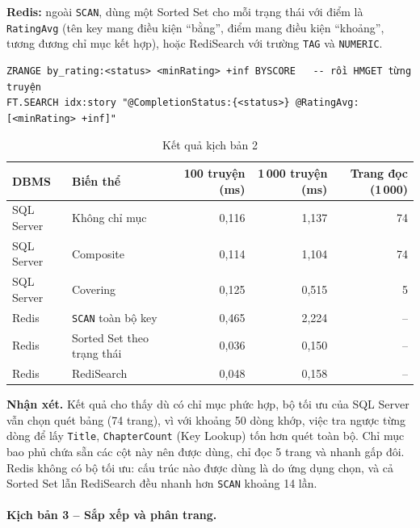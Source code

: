 \textbf{Redis:} ngoài \texttt{SCAN}, dùng một Sorted Set cho mỗi trạng thái với điểm là \texttt{RatingAvg} (tên key mang điều kiện ``bằng'', điểm mang điều kiện ``khoảng'', tương đương chỉ mục kết hợp), hoặc RediSearch với trường \texttt{TAG} và \texttt{NUMERIC}.

\begin{verbatim}
ZRANGE by_rating:<status> <minRating> +inf BYSCORE   -- rồi HMGET từng truyện
FT.SEARCH idx:story "@CompletionStatus:{<status>} @RatingAvg:[<minRating> +inf]"
\end{verbatim}

\begin{table}[H]
\centering\small
\begin{tabular}{|l|l|r|r|r|}
\hline
\textbf{DBMS} & \textbf{Biến thể} & \textbf{100 truyện (ms)} & \textbf{1\,000 truyện (ms)} & \textbf{Trang đọc (1\,000)} \\ \hline
SQL Server & Không chỉ mục & 0,116 & 1,137 & 74 \\ \hline
SQL Server & Composite & 0,114 & 1,104 & 74 \\ \hline
SQL Server & Covering & 0,125 & 0,515 & 5 \\ \hline
Redis & \texttt{SCAN} toàn bộ key & 0,465 & 2,224 & -- \\ \hline
Redis & Sorted Set theo trạng thái & 0,036 & 0,150 & -- \\ \hline
Redis & RediSearch & 0,048 & 0,158 & -- \\ \hline
\end{tabular}
\caption{Kết quả kịch bản 2}
\label{tab:idx-i2}
\end{table}

\textbf{Nhận xét.} Kết quả cho thấy dù có chỉ mục phức hợp, bộ tối ưu của SQL Server vẫn chọn quét bảng (74 trang), vì với khoảng 50 dòng khớp, việc tra ngược từng dòng để lấy \texttt{Title}, \texttt{ChapterCount} (Key Lookup) tốn hơn quét toàn bộ. Chỉ mục bao phủ chứa sẵn các cột này nên được dùng, chỉ đọc 5 trang và nhanh gấp đôi. Redis không có bộ tối ưu: cấu trúc nào được dùng là do ứng dụng chọn, và cả Sorted Set lẫn RediSearch đều nhanh hơn \texttt{SCAN} khoảng 14 lần.

\paragraph{Kịch bản 3 -- Sắp xếp và phân trang.}

